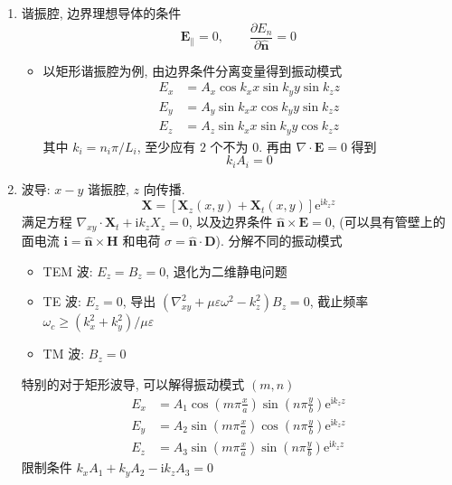 \documentclass[12pt,a4paper]{article}%
\numberwithin{equation}{section}%
\renewcommand*{\vec}[1]{\bm{#1}}%
\newcommand\mi{\mathrm{i}}
\newcommand\e{\mathrm{e}}%
\newcommand*{\uvec}[1]{\hat{\vec{#1}}}
\begin{document}
\begin{enumerate}
    \item 谐振腔, 边界理想导体的条件
    \begin{equation}
        \vec E_{\parallel} = 0, \qquad \frac{\partial E_n}{\partial \uvec n} = 0
    \end{equation}
    \begin{itemize}
        \item 以矩形谐振腔为例, 由边界条件分离变量得到振动模式
        \begin{align}
            E_x &= A_x\cos k_x x \sin k_y y \sin k_z z \\
            E_y &= A_y\sin k_x x \cos k_y y \sin k_z z \\
            E_z &= A_z\sin k_x x \sin k_y y \cos k_z z
        \end{align} 
        其中 $k_i = n_i\pi/L_i$, 至少应有 $2$ 个不为 $0$. 再由 $\nabla\cdot \vec E = 0$ 得到
        \begin{equation}
            k_i A_i = 0
        \end{equation}
    \end{itemize}
    \item 波导: $x-y$ 谐振腔, $z$ 向传播. 
    \begin{equation}
        \vec X = \left[\vec X_z(x,y) + \vec X_t(x,y)\right]\e^{\mi k_z z}
    \end{equation}
    满足方程 $\nabla_{xy}\cdot\vec X_t + \mi k_z X_z = 0$, 以及边界条件 $\uvec n\times\vec E = 0$, (可以具有管壁上的面电流 $\vec i = \uvec n\times\vec H$ 和电荷 $\sigma = \uvec n\cdot\vec D$). 分解不同的振动模式
    \begin{itemize}
        \item TEM 波: $E_z = B_z = 0$, 退化为二维静电问题
        \item TE 波: $E_z = 0$, 导出 $(\nabla^2_{xy}+\mu\varepsilon\omega^2-k_z^2)B_z = 0$, 截止频率 $\omega_c\ge\left(k_x^2+k_y^2\right)/\mu\varepsilon$
        \item TM 波: $B_z = 0$
    \end{itemize}
    特别的对于矩形波导, 可以解得振动模式 $(m,n)$
    \begin{align}
        E_x &= A_1\cos\left(m\pi\frac xa\right)\sin\left(n\pi\frac yb\right)\e^{\mi k_z z} \\
        E_y &= A_2\sin\left(m\pi\frac xa\right)\cos\left(n\pi\frac yb\right)\e^{\mi k_z z} \\
        E_z &= A_3\sin\left(m\pi\frac xa\right)\sin\left(n\pi\frac yb\right)\e^{\mi k_z z}
    \end{align}
    限制条件 $k_xA_1 + k_y A_2 - \mi k_z A_3 = 0$
\end{enumerate}
\end{document}
